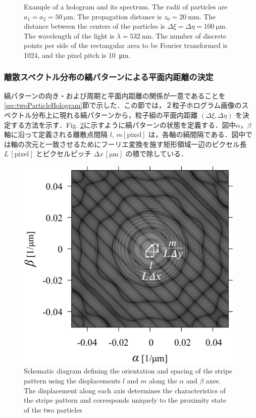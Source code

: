 \begin{figure}[htbp]
    \caption{Example of a hologram and its spectrum. The radii of particles are $a_1 = a_2 = \SI{50}{\um}$. The propagation distance is $z_0 = \SI{20}{\mm}$. The distance between the centers of the particles is $\Delta \xi = \Delta \eta = \SI{100}{\um}$. The wavelength of the light is $\lambda = \SI{532}{\nm}$. The number of discrete points per side of the rectangular area to be Fourier transformed is 1024, and the pixel pitch is \SI{10}{\um}.} 
    \label{fig:2particleSpectrum}
\end{figure}

\subsubsection{離散スペクトル分布の縞パターンによる平面内距離の決定}
縞パターンの向き・および周期と平面内距離の関係が一意であることを\ref{sec:twoParticleHologram}節で示した．この節では，２粒子ホログラム画像のスペクトル分布上に現れる縞パターンから，粒子組の平面内距離 $(\Delta\xi,\Delta\eta)$ を決定する方法を示す．Fig. \ref{fig:stripePatternVector}に示すように縞パターンの状態を定義する．図中$\alpha$，$\beta$軸に沿って定義される離散点間隔 $l,\,m \mathrm{[pixel]}$ は，各軸の縞間隔である．図中では軸の次元と一致させるためにフーリエ変換を施す矩形領域一辺のピクセル長 $L \mathrm{\,[pixel]}$ とピクセルピッチ $\Delta x \mathrm{\,[\si{\um}]}$ の積で除している．
\begin{figure}[htbp]
    \centering
    \includegraphics[width=0.8\linewidth]{./Figure/2_Theory/stripe_pattern.pdf}
    \caption{Schematic diagram defining the orientation and spacing of the stripe pattern using the displacements $l$ and $m$ along the $\alpha$ and $\beta$ axes. The displacement along each axis determines the characteristics of the stripe pattern and corresponds uniquely to the proximity state of the two particles}
    \label{fig:stripePatternVector}
\end{figure}


